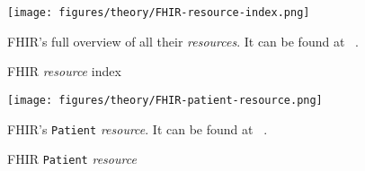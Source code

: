 \begin{figure}[H]
    \centering
    \texttt{[image: figures/theory/FHIR-resource-index.png]}
    \caption{FHIR \emph{resource} index}
    \medskip
    \small
    \raggedright
    FHIR's full overview of all their \emph{resources}. It can be found at ~\cite{FHIR-resource-index}.
    \label{fig:FHIR-resource-index}
\end{figure}

\begin{figure}[H]
    \centering
    \texttt{[image: figures/theory/FHIR-patient-resource.png]}
    \caption{FHIR \texttt{Patient} \emph{resource}}
    \medskip
    \small
    \raggedright
    FHIR's \texttt{Patient} \emph{resource}. It can be found at ~\cite{FHIR-patient-resource}.
    \label{fig:FHIR-patient-resource}
\end{figure}
